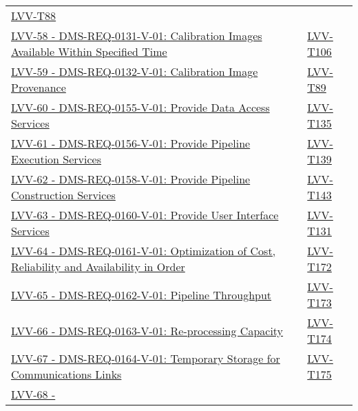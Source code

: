 \begin{longtable}[]{p{13cm}p{3cm}}
\protect\hyperlink{lvv-t88---verify-implementation-of-calibration-data-products-dms-req-0130}{LVV-T88}\tabularnewline
\href{https://jira.lsstcorp.org/browse/LVV-58}{LVV-58 -
DMS-REQ-0131-V-01: Calibration Images Available Within Specified Time} &
\protect\hyperlink{lvv-t106---verify-implementation-of-calibration-images-available-within-specified-time-dms-req-0131}{LVV-T106}\tabularnewline
\href{https://jira.lsstcorp.org/browse/LVV-59}{LVV-59 -
DMS-REQ-0132-V-01: Calibration Image Provenance} &
\protect\hyperlink{lvv-t89---verify-implementation-of-calibration-image-provenance-dms-req-0132}{LVV-T89}\tabularnewline
\href{https://jira.lsstcorp.org/browse/LVV-60}{LVV-60 -
DMS-REQ-0155-V-01: Provide Data Access Services} &
\protect\hyperlink{lvv-t135---verify-implementation-of-provide-data-access-services-dms-req-0155}{LVV-T135}\tabularnewline
\href{https://jira.lsstcorp.org/browse/LVV-61}{LVV-61 -
DMS-REQ-0156-V-01: Provide Pipeline Execution Services} &
\protect\hyperlink{lvv-t139---verify-implementation-of-provide-pipeline-execution-services-dms-req-0156}{LVV-T139}\tabularnewline
\href{https://jira.lsstcorp.org/browse/LVV-62}{LVV-62 -
DMS-REQ-0158-V-01: Provide Pipeline Construction Services} &
\protect\hyperlink{lvv-t143---verify-implementation-of-provide-pipeline-construction-services-dms-req-0158}{LVV-T143}\tabularnewline
\href{https://jira.lsstcorp.org/browse/LVV-63}{LVV-63 -
DMS-REQ-0160-V-01: Provide User Interface Services} &
\protect\hyperlink{lvv-t131---verify-implementation-of-provide-user-interface-services--dms-req-0160}{LVV-T131}\tabularnewline
\href{https://jira.lsstcorp.org/browse/LVV-64}{LVV-64 -
DMS-REQ-0161-V-01: Optimization of Cost, Reliability and Availability in
Order} &
\protect\hyperlink{lvv-t172---verify-implementation-of-optimization-of-cost-reliability-and-availability-dms-req-0161}{LVV-T172}\tabularnewline
\href{https://jira.lsstcorp.org/browse/LVV-65}{LVV-65 -
DMS-REQ-0162-V-01: Pipeline Throughput} &
\protect\hyperlink{lvv-t173---verify-implementation-of-pipeline-throughput-dms-req-0162}{LVV-T173}\tabularnewline
\href{https://jira.lsstcorp.org/browse/LVV-66}{LVV-66 -
DMS-REQ-0163-V-01: Re-processing Capacity} &
\protect\hyperlink{lvv-t174---verify-implementation-of-re-processing-capacity-dms-req-0163}{LVV-T174}\tabularnewline
\href{https://jira.lsstcorp.org/browse/LVV-67}{LVV-67 -
DMS-REQ-0164-V-01: Temporary Storage for Communications Links} &
\protect\hyperlink{lvv-t175---verify-implementation-of-temporary-storage-for-communications-links-dms-req-0164}{LVV-T175}\tabularnewline
\href{https://jira.lsstcorp.org/browse/LVV-68}{LVV-68 -
}
\end{longtable}
